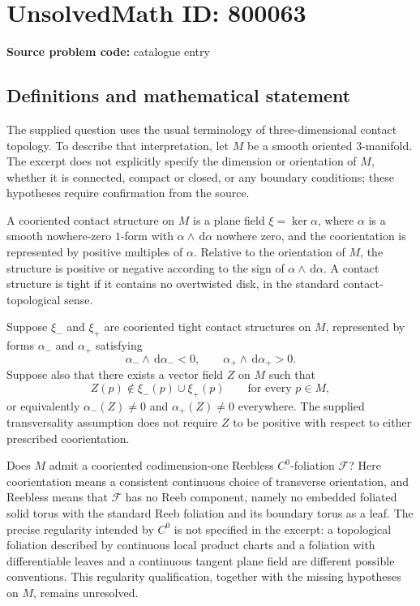 \documentclass[11pt]{article}
\newcommand{\dd}{\,\mathrm{d}}
\begin{document}
\section*{UnsolvedMath ID: 800063}
\textbf{Source problem code:} catalogue entry
\subsection{Definitions and mathematical statement}
The supplied question uses the usual terminology of three-dimensional contact topology. To describe that interpretation, let \(M\) be a smooth oriented \(3\)-manifold. The excerpt does not explicitly specify the dimension or orientation of \(M\), whether it is connected, compact or closed, or any boundary conditions; these hypotheses require confirmation from the source.

A cooriented contact structure on \(M\) is a plane field \(\xi=\ker\alpha\), where \(\alpha\) is a smooth nowhere-zero \(1\)-form with \(\alpha\wedge\dd\alpha\) nowhere zero, and the coorientation is represented by positive multiples of \(\alpha\). Relative to the orientation of \(M\), the structure is positive or negative according to the sign of \(\alpha\wedge\dd\alpha\). A contact structure is tight if it contains no overtwisted disk, in the standard contact-topological sense.

Suppose \(\xi_-\) and \(\xi_+\) are cooriented tight contact structures on \(M\), represented by forms \(\alpha_-\) and \(\alpha_+\) satisfying
\[
\alpha_-\wedge\dd\alpha_-<0,
\qquad
\alpha_+\wedge\dd\alpha_+>0.
\]
Suppose also that there exists a vector field \(Z\) on \(M\) such that
\[
Z(p)\notin\xi_-(p)\cup\xi_+(p)
\qquad\text{for every }p\in M,
\]
or equivalently \(\alpha_-(Z)\ne0\) and \(\alpha_+(Z)\ne0\) everywhere. The supplied transversality assumption does not require \(Z\) to be positive with respect to either prescribed coorientation.

Does \(M\) admit a cooriented codimension-one Reebless \(C^0\)-foliation \(\mathcal F\)? Here coorientation means a consistent continuous choice of transverse orientation, and Reebless means that \(\mathcal F\) has no Reeb component, namely no embedded foliated solid torus with the standard Reeb foliation and its boundary torus as a leaf. The precise regularity intended by \(C^0\) is not specified in the excerpt: a topological foliation described by continuous local product charts and a foliation with differentiable leaves and a continuous tangent plane field are different possible conventions. This regularity qualification, together with the missing hypotheses on \(M\), remains unresolved.
\end{document}
